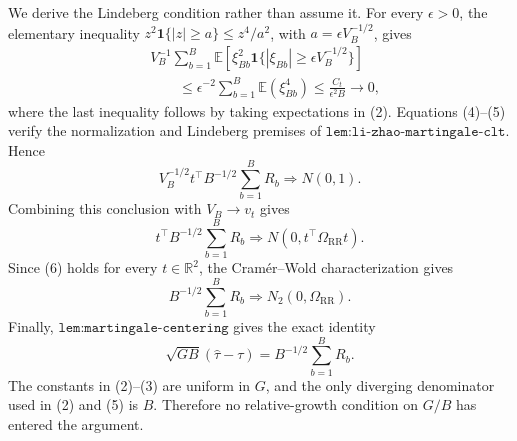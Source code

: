 We derive the Lindeberg condition rather than assume it.  For every \(\epsilon>0\), the elementary inequality \(z^2\mathbf1\{|z|\geq a\}\leq z^4/a^2\), with \(a=\epsilon V_B^{-1/2}\), gives
\[
 \begin{aligned}
 &V_B^{-1}\sum_{b=1}^B
  \mathbb E\left[\xi_{Bb}^2
   \mathbf1\{|\xi_{Bb}|\geq\epsilon V_B^{-1/2}\}\right]\\
 &\qquad\leq
 \epsilon^{-2}\sum_{b=1}^B\mathbb E(\xi_{Bb}^4)
 \leq \frac{C_t}{\epsilon^2B}\longrightarrow0,            \tag{5}
 \end{aligned}
\]
where the last inequality follows by taking expectations in (2).  Equations (4)--(5) verify the normalization and Lindeberg premises of \(\texttt{lem:li-zhao-martingale-clt}\).  Hence
\[
 V_B^{-1/2}t^\top B^{-1/2}\sum_{b=1}^BR_b\Rightarrow N(0,1).
\]
Combining this conclusion with \(V_B\to v_t\) gives
\[
 t^\top B^{-1/2}\sum_{b=1}^BR_b
 \Rightarrow N(0,t^\top\Omega_{\mathrm{RR}}t).             \tag{6}
\]
Since (6) holds for every \(t\in\mathbb R^2\), the Cram\'er--Wold characterization gives
\[
 B^{-1/2}\sum_{b=1}^BR_b\Rightarrow N_2(0,\Omega_{\mathrm{RR}}).
\]
Finally, \(\texttt{lem:martingale-centering}\) gives the exact identity
\[
 \sqrt{GB}(\widehat\tau-\tau)=B^{-1/2}\sum_{b=1}^BR_b.
\]
The constants in (2)--(3) are uniform in \(G\), and the only diverging denominator used in (2) and (5) is \(B\).  Therefore no relative-growth condition on \(G/B\) has entered the argument.